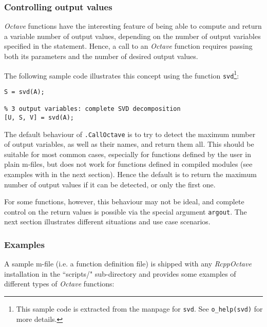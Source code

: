 \documentclass[english,10pt,a4paper]{article}\usepackage[]{graphicx}\usepackage[]{color}
\let\proglang=\textit
\let\code=\texttt
\newcommand{\pkgname}[1]{\textit{#1}\xspace}
\newcommand{\octave}{\proglang{Octave}\xspace}
\begin{document}
\subsubsection{Controlling output values}
\label{sec:argout}

\octave functions have the interesting feature of being able to compute
and return a variable number of output values, depending on the number of output
variables specified in the statement.
Hence, a call to an \octave function requires passing both its parameters and
the number of desired output values.

The following sample code illustrates this concept using the function
\code{svd}\footnote{This sample code is extracted from the manpage for
\code{svd}. See \code{o\_help(svd)} for more details.}:

\begin{Verbatim}[frame=single]
% single output variable: eigen values only
S = svd(A);

% 3 output variables: complete SVD decomposition  
[U, S, V] = svd(A);
\end{Verbatim}

The default behaviour of \code{.CallOctave} is to try to
detect the maximum number of output variables, as well as their names, and
return them all.
This should be suitable for most common cases, especially for functions
defined by the user in plain m-files, but does not work for functions defined in
compiled modules (see examples with in the next section).
Hence the default is to return the maximum number of output values if it can be
detected, or only the first one.

For some functions, however, this behaviour may not be ideal, and complete
control on the return values is possible via the special argument \code{argout}.
The next section illustrates different situations and use case scenarios.

\subsubsection{Examples}

A sample m-file (i.e. a function definition file) is shipped with any 
\pkgname{RcppOctave} installation in the ``scripts/" sub-directory and provides
some examples of different types of \octave functions:
\end{document}
